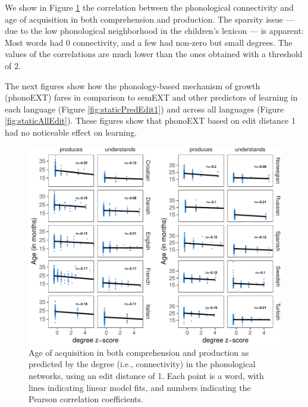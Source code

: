 \documentclass[english,,man,floatsintext]{apa6}
\begin{document}
We show in Figure \ref{fig:corrPlot} the correlation between the phonological connectivity and age of acquisition in both comprehension and production. The sparsity issue --- due to the low phonological neighborhood in the children's lexicon --- is apparent: Most words had 0 connectivity, and a few had non-zero but small degrees. The values of the correlations are much lower than the ones obtained with a threshold of 2.

The next figures show how the phonology-based mechanism of growth (phonoEXT) fares in comparison to semEXT and other predictors of learning in each language (Figure \ref{fig:staticPredEdit1}) and across all languages (Figure \ref{fig:staticAllEdit}). These figures show that phonoEXT based on edit distance 1 had no noticeable effect on learning.

\begin{figure}[!h]
\includegraphics[width=\textwidth]{ms_files/figure-latex/corrPlot-1} \caption{Age of acquisition in both comprehension and production as predicted by the degree (i.e., connectivity) in the phonological networks, using an edit distance of 1. Each point is a word, with lines indicating linear model fits, and numbers indicating the Pearson correlation coefficients.}\label{fig:corrPlot}
\end{figure}
\end{document}
